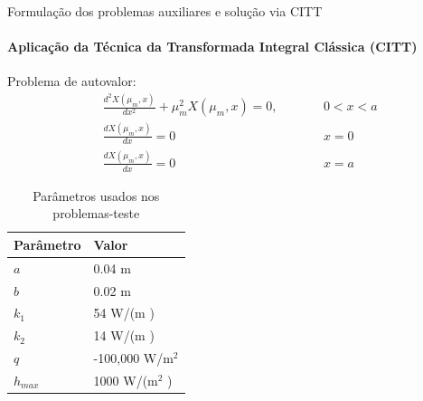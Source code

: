 \documentclass{beamer}
\begin{document}
\begin{frame}{Formulação dos problemas auxiliares e solução via CITT}
	\framesubtitle{Aplicação da Técnica da Transformada Integral Clássica (CITT)}
	Problema de autovalor:
	\begin{subequations}
		\begin{alignat*}{2}
		& \frac{d^2 X(\mu_m, x)}{d x^2} + \mu_m^2 X(\mu_m, x) = 0, \quad\quad  && 0 < x < a\\
		& \frac{d X(\mu_m, x)}{d x} = 0 && x = 0  \\
		& \frac{d X(\mu_m, x)}{d x} = 0 && x = a 
		\end{alignat*}
	\end{subequations}
\end{frame}

\begin{frame}
	\begin{table}[H]
		\centering
		\caption{Parâmetros usados nos problemas-teste}
		\begin{tabular}{|l|l|}
			\hline
			\textbf{Parâmetro} & \textbf{Valor}  \\ \hline
			$a$       & 0.04 m   \\ \hline
			$b$       & 0.02 m     \\ \hline
			$k_1$     & 54 W/(m \celsius)  \\ \hline
			$k_2$     & 14 W/(m \celsius) \\ \hline
			$q$       & -100,000 W/$\text{m}^2$ \\ \hline
			$h_{max}$       & 1000 W/($\text{m}^2$ \celsius) \\ \hline
		\end{tabular}		
		\label{tabela_params}
	\end{table}
\end{frame}

%

	
\end{document}
